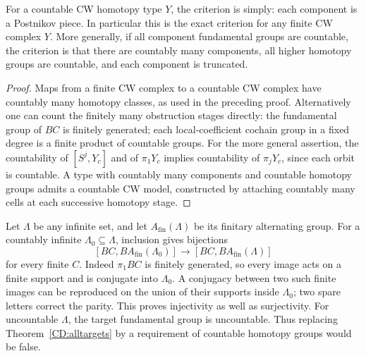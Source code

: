 \begin{corollary}
\label{CD:countabletargets}
For a countable CW homotopy type $Y$, the criterion is simply:
each component is a Postnikov piece.  In particular this is the exact
criterion for any finite CW complex $Y$.
More generally, if all component fundamental groups are countable,
the criterion is that there are countably many components, all higher
homotopy groups are countable, and each component is truncated.
\end{corollary}
\begin{proof}
Maps from a finite CW complex to a countable CW complex have countably
many homotopy classes, as used in the preceding proof.  Alternatively
one can count the finitely many obstruction stages directly: the
fundamental group of $BC$ is finitely generated; each local-coefficient
cochain group in a fixed degree is a finite product of countable groups.
For the more general assertion, the countability of $[S^j,Y_c]$ and
of $\pi_1Y_c$ implies countability of $\pi_jY_c$, since each orbit
is countable.  A type with countably many components and countable
homotopy groups admits a countable CW model, constructed by attaching
countably many cells at each successive homotopy stage.
\end{proof}

\begin{remark}
\label{CD:largegroups}
Let $\Lambda$ be any infinite set, and let $A_{\mathrm{fin}}(\Lambda)$
be its finitary alternating group.  For a countably infinite
$\Lambda_0\subseteq\Lambda$, inclusion gives bijections
\[
 [BC,B A_{\mathrm{fin}}(\Lambda_0)]
 \longrightarrow [BC,B A_{\mathrm{fin}}(\Lambda)]
\]
for every finite $C$.  Indeed $\pi_1BC$ is finitely generated, so every
image acts on a finite support and is conjugate into $\Lambda_0$.
A conjugacy between two such finite images can be reproduced on the
union of their supports inside $\Lambda_0$; two spare letters correct
the parity.  This proves injectivity as well as surjectivity.
For uncountable $\Lambda$, the target fundamental group is uncountable.
Thus replacing Theorem~\ref{CD:alltargets} by a requirement of countable
homotopy groups would be false.
\end{remark}

